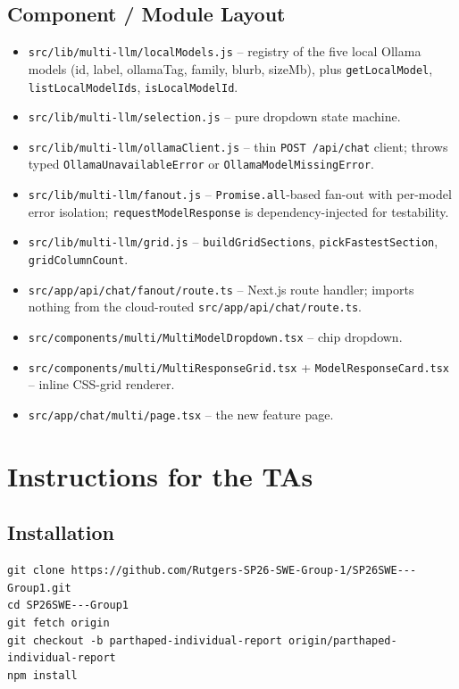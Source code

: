 \documentclass[11pt]{article}
\begin{document}
\subsection{Component / Module Layout}

\begin{itemize}[leftmargin=*]
  \item \texttt{src/lib/multi-llm/localModels.js} -- registry of the
    five local Ollama models (id, label, ollamaTag, family, blurb,
    sizeMb), plus \texttt{getLocalModel}, \texttt{listLocalModelIds},
    \texttt{isLocalModelId}.
  \item \texttt{src/lib/multi-llm/selection.js} -- pure dropdown state
    machine.
  \item \texttt{src/lib/multi-llm/ollamaClient.js} -- thin
    \texttt{POST /api/chat} client; throws typed
    \texttt{OllamaUnavailableError} or
    \texttt{OllamaModelMissingError}.
  \item \texttt{src/lib/multi-llm/fanout.js} --
    \texttt{Promise.all}-based fan-out with per-model error isolation;
    \texttt{requestModelResponse} is dependency-injected for testability.
  \item \texttt{src/lib/multi-llm/grid.js} --
    \texttt{buildGridSections}, \texttt{pickFastestSection},
    \texttt{gridColumnCount}.
  \item \texttt{src/app/api/chat/fanout/route.ts} -- Next.js route
    handler; imports nothing from the cloud-routed
    \texttt{src/app/api/chat/route.ts}.
  \item \texttt{src/components/multi/MultiModelDropdown.tsx} --
    chip dropdown.
  \item \texttt{src/components/multi/MultiResponseGrid.tsx} +
    \texttt{ModelResponseCard.tsx} -- inline CSS-grid renderer.
  \item \texttt{src/app/chat/multi/page.tsx} -- the new feature page.
\end{itemize}

\section{Instructions for the TAs}

\subsection{Installation}

\begin{lstlisting}
git clone https://github.com/Rutgers-SP26-SWE-Group-1/SP26SWE---Group1.git
cd SP26SWE---Group1
git fetch origin
git checkout -b parthaped-individual-report origin/parthaped-individual-report
npm install
\end{lstlisting}
\end{document}
